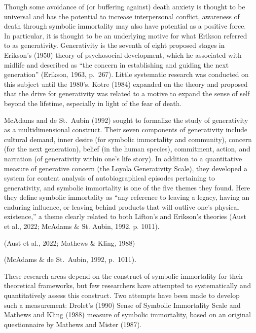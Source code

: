 \documentclass[
  man]{apa6}
\begin{document}
Though some avoidance of (or buffering against) death anxiety is thought
to be universal and has the potential to increase interpersonal
conflict, awareness of death through symbolic immortality may also have
potential as a positive force. In particular, it is thought to be an
underlying motive for what Erikson referred to as generativity.
Generativity is the seventh of eight proposed stages in Erikson's (1950)
theory of psychosocial development, which he associated with midlife and
described as ``the concern in establishing and guiding the next
generation'' (Erikson, 1963, p.~267). Little systematic research was
conducted on this subject until the 1980's. Kotre (1984) expanded on the
theory and proposed that the drive for generativity was related to a
motive to expand the sense of self beyond the lifetime, especially in
light of the fear of death.

McAdams and de St.~Aubin (1992) sought to formalize the study
of generativity as a multidimensional construct. Their seven components
of generativity include cultural demand, inner desire (for symbolic
immortality and community), concern (for the next generation), belief
(in the human species), commitment, action, and narration (of
generativity within one's life story). In addition to a quantitative
measure of generative concern (the Loyola Generativity Scale), they
developed a system for content analysis of autobiographical episodes
pertaining to generativity, and symbolic immortality is one of the five
themes they found. Here they define symbolic immortality as ``any
reference to leaving a legacy, having an enduring influence, or leaving
behind products that will outlive one's physical existence,'' a theme
clearly related to both Lifton's and Erikson's theories (Aust et al., 2022; McAdams \& St. Aubin, 1992, p. 1011).

(Aust et al., 2022; Mathews \& Kling, 1988)

(McAdams \& de St.~Aubin, 1992, p.~1011).

These research areas depend on the construct of symbolic immortality for
their theoretical frameworks, but few researchers have attempted to
systematically and quantitatively assess this construct. Two attempts
have been made to develop such a measurement: Drolet's (1990) Sense of
Symbolic Immortality Scale and Mathews and Kling (1988) measure of
symbolic immortality, based on an original questionnaire by Mathews and
Mister (1987).
\end{document}
